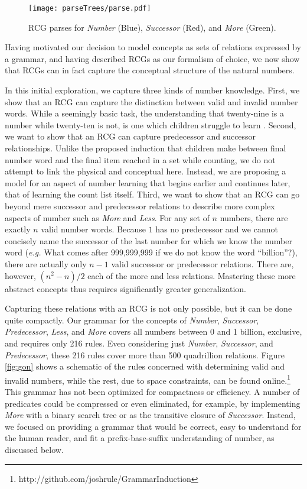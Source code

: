 \documentclass[10pt,letterpaper]{article}
\begin{document}
\begin{figure*}[t]
  \begin{centering}
    \texttt{[image: parseTrees/parse.pdf]}
    \caption{RCG parses for \emph{Number} (Blue), \emph{Successor} (Red), and \emph{More} (Green).}
    \label{fig:parse}
  \end{centering}
\end{figure*}

Having motivated our decision to model concepts as sets of relations
expressed by a grammar, and having described RCGs as our formalism of
choice, we now show that RCGs can in fact capture the conceptual
structure of the natural numbers.

In this initial exploration, we capture three kinds of number
knowledge. First, we show that an RCG can capture the distinction
between valid and invalid number words. While a seemingly basic task,
the understanding that twenty-nine is a number while twenty-ten is
not, is one which children struggle to learn \citep{FusRicBriar1982}.
Second, we want to show that an RCG can capture predecessor and
successor relationships. Unlike the proposed induction that children
make between final number word and the final item reached in a set
while counting, we do not attempt to link the physical and conceptual
here. Instead, we are proposing a model for an aspect of number
learning that begins earlier and continues later, that of learning the
count list itself. Third, we want to show that an RCG can go beyond
mere successor and predecessor relations to describe more complex
aspects of number such as \emph{More} and \emph{Less}. For any set of
$n$ numbers, there are exactly $n$ valid number words. Because $1$ has
no predecessor and we cannot concisely name the successor of the last
number for which we know the number word ({\it e.g.} What comes after
999,999,999 if we do not know the word ``billion''?), there are
actually only $n-1$ valid successor or predecessor relations. There
are, however, $(n^2-n)/2$ each of the more and less relations.
Mastering these more abstract concepts thus requires significantly
greater generalization.

Capturing these relations with an RCG is not only possible, but it can
be done quite compactly. Our grammar for the concepts of
\emph{Number}, \emph{Successor}, \emph{Predecessor}, \emph{Less}, and
\emph{More} covers all numbers between 0 and 1 billion, exclusive, and
requires only 216 rules. Even considering just \emph{Number},
\emph{Successor}, and \emph{Predecessor}, these 216 rules cover more
than 500 quadrillion relations. Figure \ref{fig:gon} shows a schematic
of the rules concerned with determining valid and invalid numbers,
while the rest, due to space constraints, can be found
online.\footnote{http://github.com/joshrule/GrammarInduction} This
grammar has not been optimized for compactness or efficiency. A number
of predicates could be compressed or even eliminated, for example, by
implementing \emph{More} with a binary search tree or as the
transitive closure of \emph{Successor}. Instead, we focused on
providing a grammar that would be correct, easy to understand for the
human reader, and fit a prefix-base-suffix understanding of number, as
discussed below.
\end{document}
